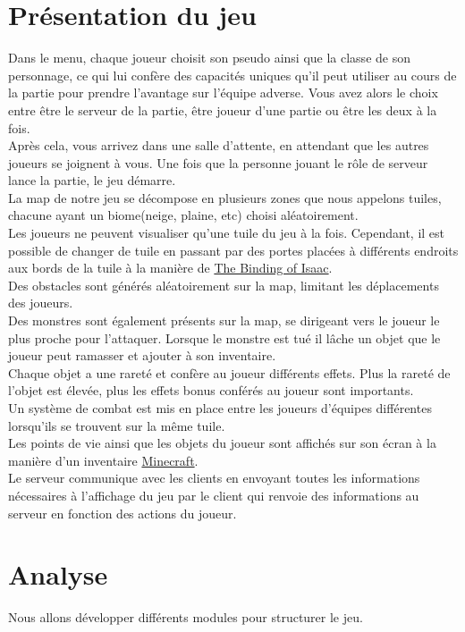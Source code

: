 \documentclass[11pt]{article}
\begin{document}
    \section{Présentation du jeu}
    Dans le menu, chaque joueur choisit son pseudo ainsi que la classe de son personnage, ce qui lui confère des capacités uniques qu’il peut utiliser au cours de la partie pour prendre l’avantage sur l’équipe adverse.
    Vous avez alors le choix entre être le serveur de la partie, être joueur d’une partie ou être les deux à la fois. \\
    Après cela, vous arrivez dans une salle d’attente, en attendant que les autres joueurs se joignent à vous. Une fois que la personne jouant le rôle de serveur lance la partie, le jeu démarre. \\
    La map de notre jeu se décompose en plusieurs zones que nous appelons tuiles, chacune ayant un biome(neige, plaine, etc) choisi aléatoirement. \\
    Les joueurs ne peuvent visualiser qu’une tuile du jeu à la fois. Cependant, il est possible de changer de tuile en passant par des portes placées à différents endroits 
    aux bords de la tuile à la manière de \href{https://en.wikipedia.org/wiki/The_Binding_of_Isaac_(video_game)}{The Binding of Isaac}. \\
    Des obstacles sont générés aléatoirement sur la map, limitant les déplacements des joueurs. \\
    Des monstres sont également présents sur la map, se dirigeant vers le joueur le plus proche pour l’attaquer. Lorsque le monstre est tué il lâche un objet que le joueur peut
    ramasser et ajouter à son inventaire.\\
    Chaque objet a une rareté et confère au joueur différents effets. Plus la rareté de l’objet est élevée, plus les effets bonus conférés au joueur sont importants. \\
    Un système de combat est mis en place entre les joueurs d’équipes différentes lorsqu’ils se trouvent sur la même tuile. \\
    Les points de vie ainsi que les objets du joueur sont affichés sur son écran à la manière d’un inventaire \href{https://fr.wikipedia.org/wiki/Minecraft}{Minecraft}.\\ 
    Le serveur communique avec les clients en envoyant toutes les informations nécessaires à l’affichage du jeu par le client qui renvoie des informations au serveur 
    en fonction des actions du joueur.

	\section{Analyse}
	Nous allons développer différents modules pour structurer le jeu.
\end{document}
